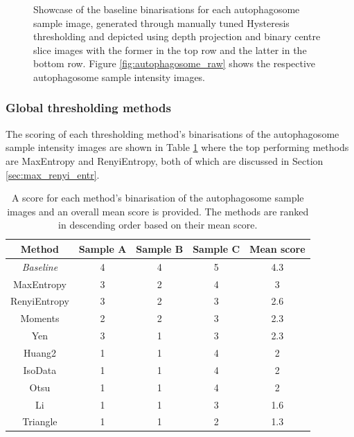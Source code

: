 \begin{figure}[ht!]
	\caption[Showcase of the baseline binarisations for each autophagosome sample image.]{Showcase of the baseline binarisations for each autophagosome sample image, generated through manually tuned Hysteresis thresholding and depicted using depth projection and binary centre slice images with the former in the top row and the latter in the bottom row. Figure \ref{fig:autophagosome_raw} shows the respective autophagosome sample intensity images.}
	\label{fig:auto_baseline}
\end{figure}
\FloatBarrier

\subsubsection{Global thresholding methods}
The scoring of each thresholding method's binarisations of the autophagosome sample intensity images are shown in Table \ref{tab:auto_global_ranks} where the top performing methods are MaxEntropy and RenyiEntropy, both of which are discussed in Section \ref{sec:max_renyi_entr}.
\begin{table}[hb!]
	\centering
	\begin{tabular}{|c|c|c|c|c|}
		\hline
		\textbf{Method} & \textbf{Sample A} & \textbf{Sample B} & \textbf{Sample C} & \textbf{Mean score}\\
		\hline
		\textit{Baseline} & 4 & 4 & 5 & 4.3\\
		\hline
		MaxEntropy & 3 & 2 & 4 & 3 \\
		\hline
		RenyiEntropy & 3 & 2 & 3 & 2.6 \\
		\hline
		Moments & 2 & 2 & 3 & 2.3 \\
		\hline
		Yen & 3 & 1 & 3 & 2.3 \\
		\hline
		Huang2 & 1 & 1 & 4 & 2 \\
		\hline
		IsoData & 1 & 1 & 4 & 2 \\
		\hline
		Otsu & 1 & 1 & 4 & 2 \\
		\hline
		Li & 1 & 1 & 3 & 1.6 \\
		\hline
		Triangle & 1 & 1 & 2 & 1.3 \\
		\hline
	\end{tabular}
	\caption[A score for each method's binarisation of the autophagosome sample images with an overall mean score provided.]{A score for each method's binarisation of the autophagosome sample images and an overall mean score is provided. The methods are ranked in descending order based on their mean score.}
	\label{tab:auto_global_ranks}
\end{table}

